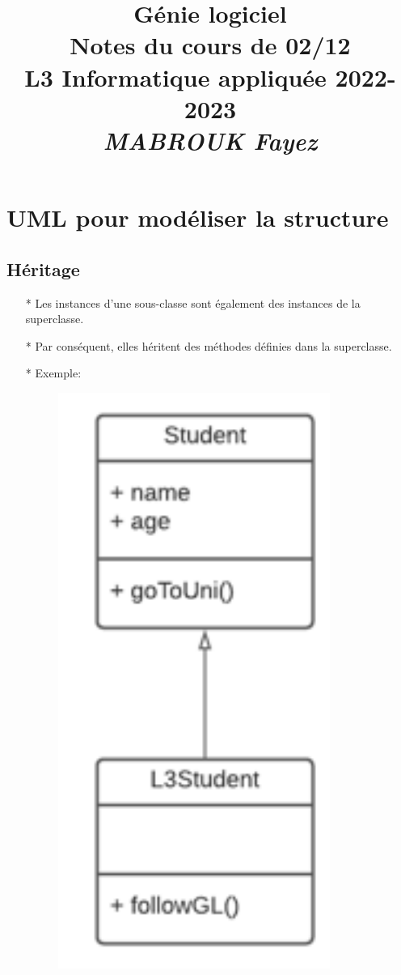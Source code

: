 \documentclass[12pt]{article}
\title{{\bf  Génie logiciel} \\
	Notes du cours de 02/12  \\
	{\small L3 Informatique appliquée 2022-2023} \\
	{\it \small MABROUK Fayez}}
\begin{document}
	\maketitle
	\newpage
		\section{UML pour modéliser la structure}
	\subsection{Héritage}
	\begin{itemize}
		\item[* ] Les instances d'une sous-classe sont également des instances de la
		superclasse.
		\item[* ] Par conséquent, elles héritent des méthodes définies dans la
		superclasse.
		\item[* ] Exemple:
		\begin{figure}[!hbtp]
			\centering
			\includegraphics[scale=0.75]{Capture1.PNG}

\end{figure}
\end{itemize}
\end{document}
